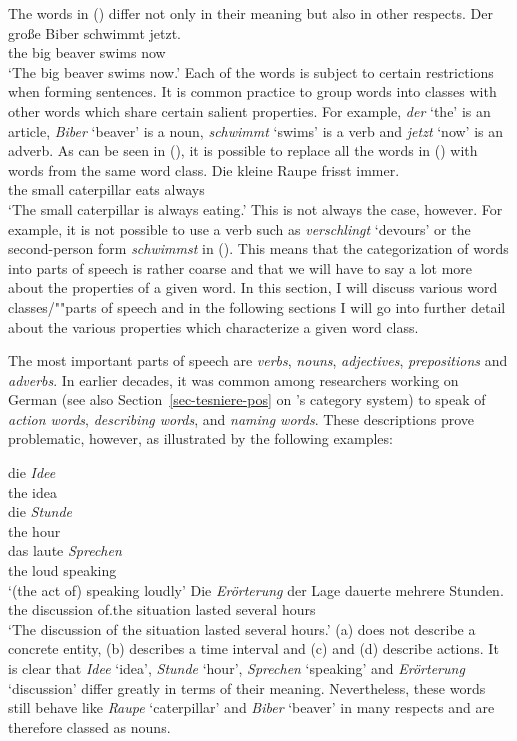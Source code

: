 The words in () differ not only in their meaning but also in other respects.
\ea
\gll Der große Biber  schwimmt jetzt.\\
     the big   beaver swims now\\
\glt `The big beaver swims now.'
\z
Each of the words is subject to certain restrictions when forming sentences. It is common practice to group words into classes with
other words which share certain salient properties. For example, \emph{der} `the' is an article, \emph{Biber} `beaver' is a noun,
\emph{schwimmt} `swims' is a verb and \emph{jetzt} `now' is an adverb. As can
be seen in (), it is possible to replace all the words in () with words from the same word class.
\ea
\gll Die kleine Raupe       frisst  immer.\\
     the small  caterpillar eats    always\\
\glt `The small caterpillar is always eating.'
\z
This is not always the case, however. For example, it is not possible to use a verb such as \emph{verschlingt} `devours' or the second-person form
\emph{schwimmst} in (). This means that the categorization of words into parts of speech is
rather coarse and that we will have to say a lot more about the properties of a given word. In this
section, I will discuss various word classes/""parts of speech and in the following sections I will
go into further detail about the various properties which characterize a given word class.

The most important parts of speech are \emph{verbs}, \emph{nouns},
\emph{adjectives}, \emph{prepositions} and
\emph{adverbs}. In earlier decades, it was common among researchers working on German
(see also Section~\ref{sec-tesniere-pos} on \tes's category system) to speak of \emph{action words},
\emph{describing words}, and \emph{naming words}. These descriptions prove problematic, however, as
illustrated by the following examples:


\eal
\ex 
\gll die \emph{Idee}\\
	the idea\\
\ex 
\gll die \emph{Stunde}\\
	 the hour\\
\ex 
\gll das laute \emph{Sprechen}\\
     the loud speaking\\
\glt `(the act of) speaking loudly'
\ex 
\gll Die \emph{Erörterung} der Lage dauerte mehrere Stunden.\\
     the discussion of.the situation lasted several hours\\
\glt `The discussion of the situation lasted several hours.'
\zl
(a) does not describe a concrete entity, (b) describes a time interval and (c) and (d)
describe actions. It is clear that \emph{Idee} `idea', \emph{Stunde} `hour', \emph{Sprechen}
`speaking' and \emph{Erörterung} `discussion' differ greatly in terms of their
meaning. Nevertheless, these words still behave like \emph{Raupe} `caterpillar' and \emph{Biber} `beaver' in many respects
and are therefore classed as nouns.

